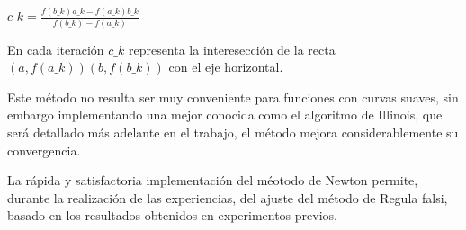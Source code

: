\begin{center}
$c\_{k} = \frac{f(b\_{k})a\_{k} - f(a\_{k})b\_{k}}{f(b\_{k}) - f(a\_{k})}$
\end{center}

En cada iteraci\'on $c\_{k}$ representa la interesecci\'on de la recta $(a,
f(a\_{k})) (b, f(b\_{k}))$ con el eje horizontal.

Este m\'etodo no resulta ser muy conveniente para funciones con curvas suaves,
sin embargo implementando una mejor conocida como el algoritmo de Illinois, que
ser\'a detallado m\'as adelante en el trabajo, el m\'etodo mejora
considerablemente su convergencia.

La r\'apida y satisfactoria implementaci\'on del m\'eotodo de Newton permite,
durante la realizaci\'on de las experiencias, del ajuste del m\'etodo de Regula
falsi, basado en los resultados obtenidos en experimentos previos.
